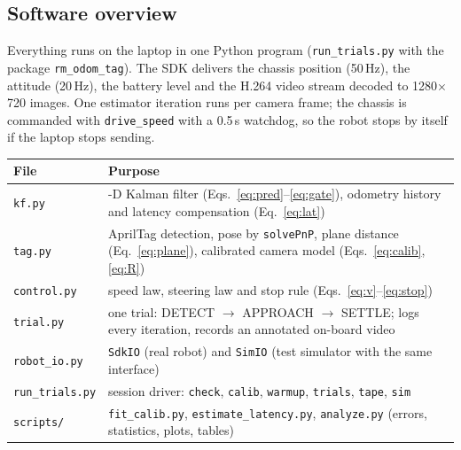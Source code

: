 \documentclass[11pt,a4paper]{article}
\begin{document}
\subsection{Software overview}
Everything runs on the laptop in one Python program (\texttt{run\_trials.py} with the package \texttt{rm\_odom\_tag}). The SDK delivers the chassis position (50\,Hz), the attitude (20\,Hz), the battery level and the H.264 video stream decoded to 1280$\times$720 images. One estimator iteration runs per camera frame; the chassis is commanded with \texttt{drive\_speed} with a 0.5\,s watchdog, so the robot stops by itself if the laptop stops sending.

\begin{center}\small
\begin{tabular}{@{}p{3.0cm}>{\raggedright\arraybackslash}p{12.8cm}@{}}
\toprule
\textbf{File} & \textbf{Purpose}\\\midrule
\texttt{kf.py} & 1-D Kalman filter (Eqs.~\ref{eq:pred}--\ref{eq:gate}), odometry history and latency compensation (Eq.~\ref{eq:lat})\\
\texttt{tag.py} & AprilTag detection, pose by \texttt{solvePnP}, plane distance (Eq.~\ref{eq:plane}), calibrated camera model (Eqs.~\ref{eq:calib}, \ref{eq:R})\\
\texttt{control.py} & speed law, steering law and stop rule (Eqs.~\ref{eq:v}--\ref{eq:stop})\\
\texttt{trial.py} & one trial: DETECT $\to$ APPROACH $\to$ SETTLE; logs every iteration, records an annotated on-board video\\
\texttt{robot\_io.py} & \texttt{SdkIO} (real robot) and \texttt{SimIO} (test simulator with the same interface)\\
\texttt{run\_trials.py} & session driver: \texttt{check}, \texttt{calib}, \texttt{warmup}, \texttt{trials}, \texttt{tape}, \texttt{sim}\\
\texttt{scripts/} & \texttt{fit\_calib.py}, \texttt{estimate\_latency.py}, \texttt{analyze.py} (errors, statistics, plots, tables)\\
\bottomrule
\end{tabular}
\end{center}
\end{document}

